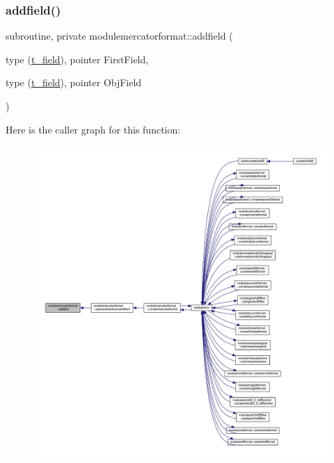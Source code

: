 \subsubsection{\texorpdfstring{addfield()}{addfield()}}
{\footnotesize\ttfamily subroutine, private modulemercatorformat\+::addfield (\begin{DoxyParamCaption}\item[{type (\mbox{\hyperlink{structmodulemercatorformat_1_1t__field}{t\+\_\+field}}), pointer}]{First\+Field,  }\item[{type (\mbox{\hyperlink{structmodulemercatorformat_1_1t__field}{t\+\_\+field}}), pointer}]{Obj\+Field }\end{DoxyParamCaption})\hspace{0.3cm}{\ttfamily [private]}}

Here is the caller graph for this function\+:\nopagebreak
\begin{figure}[H]
\begin{center}
\leavevmode
\includegraphics[width=350pt]{namespacemodulemercatorformat_ad07eac9a69191b73461fe88c7b6540d1_icgraph}
\end{center}
\end{figure}
\mbox{\label{namespacemodulemercatorformat_a824858a27df60fc6f255443ee4ca7a96}} 
